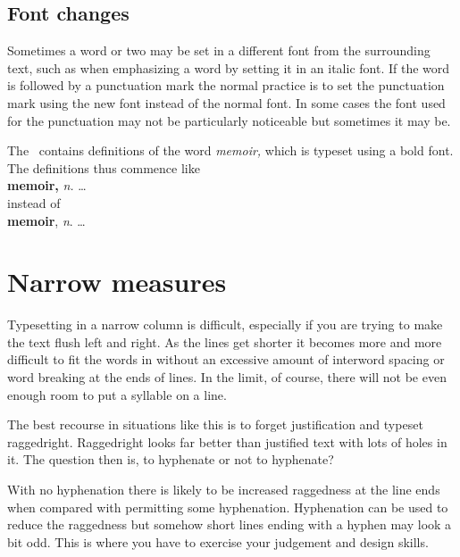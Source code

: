 \documentclass[10pt,a4paper,extrafontsizes]{memoir}
\begin{document}
\subsection{Font changes}

\begin{paracol}{2}
\switchEng
    Sometimes a word or two may be set in a different font from the 
surrounding text, such as when emphasizing 
a word by setting it in an
italic font. If the word is followed by a punctuation mark the normal
practice is to set the punctuation mark using the new font instead of 
the normal
font. In some cases the font used for the punctuation may not be
particularly noticeable but sometimes it may be. 

    The \pixfrontmatter\ contains definitions of the word \textit{memoir,}
which is typeset using a bold font. The definitions thus commence like \\
\hspace*{2em} \textbf{memoir,} \textit{n.} \ldots \\
instead of \\
\hspace*{2em} \textbf{memoir}, \textit{n}. \ldots 
\end{paracol}

\section{Narrow measures}

\begin{paracol}{2}
\switchEng
    Typesetting in a narrow column is difficult, especially if you are
trying to make the text flush left and right. As the lines get shorter
it becomes more and more difficult to fit the words in without an excessive
amount of interword spacing or word breaking at the ends of lines. 
In the limit, of course, there
will not be even enough room to put a syllable on a line.

    The best recourse in situations like this is to forget justification
and typeset raggedright. 
Raggedright looks far better than justified
text with lots of holes in it.
The question then is, to hyphenate or not to hyphenate?

    With no hyphenation there is likely to be increased raggedness at
the line ends when compared with permitting some hyphenation. Hyphenation
can be used to reduce the raggedness but somehow short lines ending with
a hyphen may look a bit odd. This is where you have to exercise your
judgement and design skills.
\end{paracol}
\end{document}
